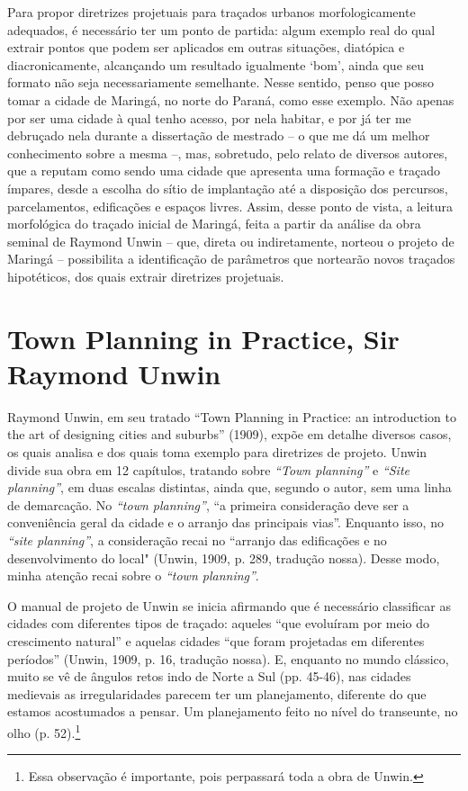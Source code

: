 \documentclass[12pt, a4paper]{book} %
\begin{document}
        Para propor diretrizes projetuais para traçados urbanos morfologicamente adequados, é necessário ter um ponto de partida: algum exemplo real do qual extrair pontos que podem ser aplicados em outras situações, diatópica e diacronicamente, alcançando um resultado igualmente `bom', ainda que seu formato não seja necessariamente semelhante. Nesse sentido, penso que posso tomar a cidade de Maringá, no norte do Paraná, como esse exemplo. Não apenas por ser uma cidade à qual tenho acesso, por nela habitar, e por já ter me debruçado nela durante a dissertação de mestrado – o que me dá um melhor conhecimento sobre a mesma –, mas, sobretudo, pelo relato de diversos autores, que a reputam como sendo uma cidade que apresenta uma formação e traçado ímpares, desde a escolha do sítio de implantação até a disposição dos percursos, parcelamentos, edificações e espaços livres. Assim, desse ponto de vista, a leitura morfológica do traçado inicial de Maringá, feita a partir da análise da obra seminal de Raymond Unwin – que, direta ou indiretamente, norteou o projeto de Maringá – possibilita a identificação de parâmetros que nortearão novos traçados hipotéticos, dos quais extrair diretrizes projetuais.

            \section{Town Planning in Practice, Sir Raymond Unwin}
        
        Raymond Unwin, em seu tratado ``Town Planning in Practice: an introduction to the art of designing cities and suburbs'' (1909), expõe em detalhe diversos casos, os quais analisa e dos quais toma exemplo para diretrizes de projeto. Unwin divide sua obra em 12 capítulos, tratando sobre \textit{``Town planning''} e \textit{``Site planning''}, em duas escalas distintas, ainda que, segundo o autor, sem uma linha de demarcação. No \textit{``town planning''}, ``a primeira consideração deve ser a conveniência geral da cidade e o arranjo das principais vias''. Enquanto isso, no \textit{``site planning''}, a consideração recai no ``arranjo das edificações e no desenvolvimento do local" (Unwin, 1909, p. 289, tradução nossa). Desse modo, minha atenção recai sobre o \textit{``town planning''}.

        O manual de projeto de Unwin se inicia afirmando que é necessário classificar as cidades com diferentes tipos de traçado: aqueles ``que evoluíram por meio do crescimento natural'' e aquelas cidades ``que foram projetadas em diferentes períodos'' (Unwin, 1909, p. 16, tradução nossa). E, enquanto no mundo clássico, muito se vê de ângulos retos indo de Norte a Sul (pp. 45-46), nas cidades medievais as irregularidades parecem ter um planejamento, diferente do que estamos acostumados a pensar. Um planejamento feito no nível do transeunte, no olho (p. 52).\footnote[4]{Essa observação é importante, pois perpassará toda a obra de Unwin.}
\end{document}
